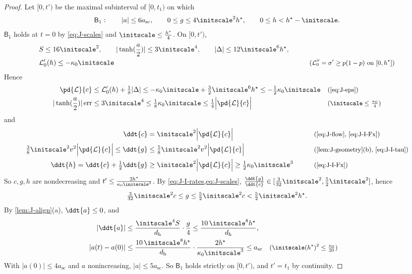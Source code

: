 \begin{proof}
Let $[0,t')$ be the maximal subinterval of $[0,t_1)$ on which
\[
 \mathsf B_1:\qquad |a|\le6a_{\mathrm{sc}},\qquad 0\le g\le4\initscale^2 h^\star,\qquad 0\le h< h^\star-\initscale .
\]
$\mathsf B_1$ holds at $t=0$ by \cref{eq:J-scales} and $\initscale\le\frac{h^\star}{4}$. On $[0,t')$,
\begin{alignat*}{2}
 &S\le16\initscale^2,\qquad |\tanh(\frac{a}{2})|\le3\initscale^4,\qquad |\Delta|\le12\initscale^6 h^\star, &\qquad& \\
 &\mathcal L_0'(h)\le-\kappa_0\initscale && \why{$\mathcal L_0''=\sigma'\ge p(1-p)$ on $[0,h^\star]$}
\end{alignat*}
Hence
\begin{align}
  \pd{\mathcal L}{c}&\le \mathcal L_0'( h)+\tfrac{1}{8}|\Delta|\le-\kappa_0\initscale+\tfrac{3}{2}\initscale^6 h^\star\le-\tfrac{1}{2}\kappa_0\initscale && \why{\cref{eq:J-eps}}\label{eq:J-I-Fx}\\
 |\tanh(\frac{a}{2})|\,\mathrm{err}&\le3\initscale^4\le\tfrac{1}{8}\kappa_0\initscale\le\tfrac{1}{4}\Bigl|\pd{\mathcal L}{c}\Bigr| && \why{$\initscale\le\tfrac{\kappa_0}{4}$}\label{eq:J-I-tau}
\end{align}
and
\begin{alignat}{2}
 \ddt{c}&=\initscale^2\Bigl|\pd{\mathcal L}{c}\Bigr| &\qquad& \why{\cref{eq:J-flow}, \cref{eq:J-I-Fx}}\nonumber\\
 \tfrac{3}{8}\initscale^2v^2\Bigl|\pd{\mathcal L}{c}\Bigr|\le\ddt{g}&\le\tfrac{5}{8}\initscale^2v^2\Bigl|\pd{\mathcal L}{c}\Bigr| && \why{\cref{lem:J-geometry}(b), \cref{eq:J-I-tau}}\label{eq:J-I-rates}\\
 \ddt{h}=\ddt{c}+\tfrac{1}{2}\ddt{g}&\ge\initscale^2\Bigl|\pd{\mathcal L}{c}\Bigr|\ge\tfrac{1}{2}\kappa_0\initscale^3 && \why{\cref{eq:J-I-Fx}}\nonumber
\end{alignat}
So $c,g, h$ are nondecreasing and $t'\le\frac{2 h^\star}{\kappa_0\initscale^3}$. By \cref{eq:J-I-rates,eq:J-scales}, $\frac{\ddt{g}}{\ddt{c}}\in[\frac{3}{32}\initscale^2,\frac{5}{2}\initscale^2]$, hence
\begin{equation}
 \tfrac{3}{32}\initscale^2c\le g\le\tfrac{5}{2}\initscale^2c<\tfrac{5}{2}\initscale^2 h^\star .
 \label{eq:J-I-g}
\end{equation}
By \cref{lem:J-align}(a), $\ddt{a}\le0$, and
\begin{align*}
 |\ddt{a}|&\le\frac{\initscale^4S}{d_{\mathrm h}}\cdot\frac{g}{4}\le\frac{10\,\initscale^8 h^\star}{d_{\mathrm h}},\\
 |a(t)-a(0)|&\le\frac{10\,\initscale^8 h^\star}{d_{\mathrm h}}\cdot\frac{2 h^\star}{\kappa_0\initscale^3}\le a_{\mathrm{sc}} && \why{$\initscale(h^\star)^2\le\tfrac{\kappa_0}{20}$}
\end{align*}
With $|a(0)|\le4a_{\mathrm{sc}}$ and $a$ nonincreasing, $|a|\le5a_{\mathrm{sc}}$. So $\mathsf B_1$ holds strictly on $[0,t')$, and $t'=t_1$ by continuity.


\end{proof}
